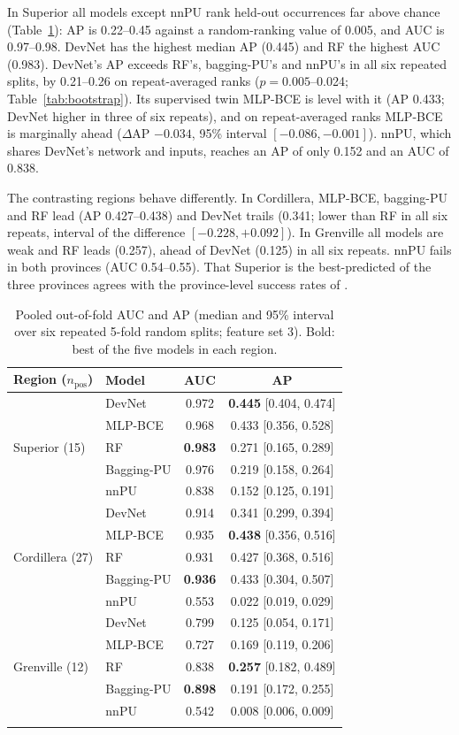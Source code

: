 \documentclass[pdflatex,sn-apa]{sn-jnl}
\begin{document}
In Superior all models except nnPU rank held-out occurrences far above chance (Table~\ref{tab:benchmark}): AP is 0.22--0.45 against a random-ranking value of 0.005, and AUC is 0.97--0.98. DevNet has the highest median AP (0.445) and RF the highest AUC (0.983). DevNet's AP exceeds RF's, bagging-PU's and nnPU's in all six repeated splits, by 0.21--0.26 on repeat-averaged ranks ($p = 0.005$--0.024; Table~\ref{tab:bootstrap}). Its supervised twin MLP-BCE is level with it (AP 0.433; DevNet higher in three of six repeats), and on repeat-averaged ranks MLP-BCE is marginally ahead ($\Delta$AP $-0.034$, 95\% interval $[-0.086, -0.001]$). nnPU, which shares DevNet's network and inputs, reaches an AP of only 0.152 and an AUC of 0.838.

The contrasting regions behave differently. In Cordillera, MLP-BCE, bagging-PU and RF lead (AP 0.427--0.438) and DevNet trails (0.341; lower than RF in all six repeats, interval of the difference $[-0.228, +0.092]$). In Grenville all models are weak and RF leads (0.257), ahead of DevNet (0.125) in all six repeats. nnPU fails in both provinces (AUC 0.54--0.55). That Superior is the best-predicted of the three provinces agrees with the province-level success rates of \citet{Parsa2024}.

\begin{table}[t]
\caption{Pooled out-of-fold AUC and AP (median and 95\% interval over six repeated 5-fold random splits; feature set 3). Bold: best of the five models in each region.}\label{tab:benchmark}
\footnotesize
\begin{tabular*}{\textwidth}{@{\extracolsep\fill}llcc}
\toprule
Region ($n_{\mathrm{pos}}$) & Model & AUC & AP \\
\midrule
\multirow{5}{*}{Superior (15)} & DevNet & 0.972 & \textbf{0.445} [0.404, 0.474] \\
 & MLP-BCE & 0.968 & 0.433 [0.356, 0.528] \\
 & RF & \textbf{0.983} & 0.271 [0.165, 0.289] \\
 & Bagging-PU & 0.976 & 0.219 [0.158, 0.264] \\
 & nnPU & 0.838 & 0.152 [0.125, 0.191] \\
\midrule
\multirow{5}{*}{Cordillera (27)} & DevNet & 0.914 & 0.341 [0.299, 0.394] \\
 & MLP-BCE & 0.935 & \textbf{0.438} [0.356, 0.516] \\
 & RF & 0.931 & 0.427 [0.368, 0.516] \\
 & Bagging-PU & \textbf{0.936} & 0.433 [0.304, 0.507] \\
 & nnPU & 0.553 & 0.022 [0.019, 0.029] \\
\midrule
\multirow{5}{*}{Grenville (12)} & DevNet & 0.799 & 0.125 [0.054, 0.171] \\
 & MLP-BCE & 0.727 & 0.169 [0.119, 0.206] \\
 & RF & 0.838 & \textbf{0.257} [0.182, 0.489] \\
 & Bagging-PU & \textbf{0.898} & 0.191 [0.172, 0.255] \\
 & nnPU & 0.542 & 0.008 [0.006, 0.009] \\
\botrule
\end{tabular*}
\end{table}
\end{document}

